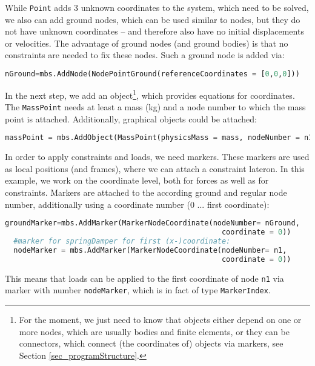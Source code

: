 %
While \texttt{Point} adds 3 unknown coordinates to the system, which need to be solved, we also can add ground nodes, which can be used similar to nodes, but they do not have unknown coordinates -- and therefore also have no initial displacements or velocities. The advantage of ground nodes (and ground bodies) is that no constraints are needed to fix these nodes.
%
Such a ground node is added via:
\begin{lstlisting}[language=Python, firstnumber=22]
  nGround=mbs.AddNode(NodePointGround(referenceCoordinates = [0,0,0]))
\end{lstlisting}
%
In the next step, we add an object\footnote{For the moment, we just need to know that objects either depend on one or more nodes, which are usually bodies and finite elements, or they can be connectors, which connect (the coordinates of) objects via markers, see Section \ref{sec_programStructure}.}, which provides equations for coordinates. The \texttt{MassPoint} needs at least a mass (kg) and a node number to which the mass point is attached. Additionally, graphical objects could be attached:
\begin{lstlisting}[language=Python, firstnumber=23]
  massPoint = mbs.AddObject(MassPoint(physicsMass = mass, nodeNumber = n1))
\end{lstlisting}
%
In order to apply constraints and loads, we need markers. These markers are used as local positions (and frames), where we can attach a constraint lateron. In this example, we work on the coordinate level, both for forces as well as for constraints.
Markers are attached to the according ground and regular node number, additionally using a coordinate number (0 ... first coordinate):
\begin{lstlisting}[language=Python, firstnumber=24]
  groundMarker=mbs.AddMarker(MarkerNodeCoordinate(nodeNumber= nGround, 
                                                  coordinate = 0))
  #marker for springDamper for first (x-)coordinate:
  nodeMarker = mbs.AddMarker(MarkerNodeCoordinate(nodeNumber= n1, 
                                                  coordinate = 0))
\end{lstlisting}
This means that loads can be applied to the first coordinate of node \texttt{n1} via marker with number \texttt{nodeMarker},
which is in fact of type \texttt{MarkerIndex}.

